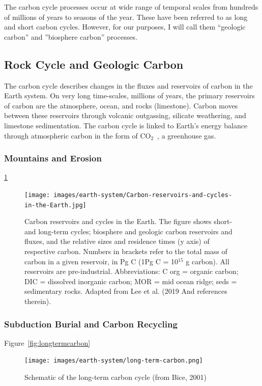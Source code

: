\documentclass{book}\usepackage{knitr}
\newcommand{\carbondioxide}{CO$_2$~}
\begin{document}
The carbon cycle processes occur at wide range of temporal scales from hundreds of millions of years to seasons of the year. These have been referred to as long and short carbon cycles. However, for our purposes, I will call them ``geologic carbon'' and ''biosphere carbon'' processes. 

\subsection{Rock Cycle and Geologic Carbon}

The carbon cycle describes changes in the fluxes and reservoirs of carbon in the Earth system. On very long time-scales, millions of years, the primary reservoirs of carbon are the atmosphere, ocean, and rocks (limestone). Carbon moves between these reservoirs through volcanic outgassing, silicate weathering, and limestone sedimentation. The carbon cycle is linked to Earth's energy balance through atmospheric carbon in the form of \carbondioxide, a greenhouse gas.

\subsubsection{Mountains and Erosion}

\ref{fig:carbonpools}

\begin{figure}
\texttt{[image: images/earth-system/Carbon-reservoirs-and-cycles-in-the-Earth.jpg]}
\caption{Carbon reservoirs and cycles in the Earth. The figure shows short-and long-term cycles; biosphere and geologic carbon reservoirs and fluxes, and the relative sizes and residence times (y axis) of respective carbon. Numbers in brackets refer to the total mass of carbon in a given reservoir, in Pg C (1Pg C = 10$^{15}$ g carbon). All reservoirs are pre-industrial. Abbreviations: C org = organic carbon; DIC = dissolved inorganic carbon; MOR = mid ocean ridge; seds = sedimentary rocks. Adapted from Lee et al. (2019 And references therein).}
\label{fig:carbonpools}
\end{figure}

\subsubsection{Subduction Burial and Carbon Recycling}

Figure~\ref{fig:longtermcarbon}

\begin{figure}
\texttt{[image: images/earth-system/long-term-carbon.png]}
\caption{Schematic of the long-term carbon cycle (from Bice, 2001)}
\label{longtermcarbon}
\end{figure}
\end{document}
